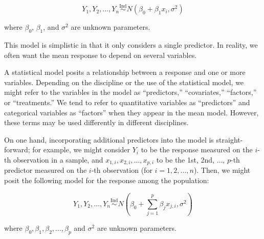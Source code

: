 \documentclass[
  letterpaper,
  DIV=11,
  numbers=noendperiod]{scrreprt}
\theoremstyle{definition}
\theoremstyle{plain}
\theoremstyle{definition}
\theoremstyle{remark}
\begin{document}
\[Y_1, Y_2, \dotsc, Y_n \stackrel{\text{Ind}}{\sim} N\left(\beta_0 + \beta_1 x_i, \sigma^2\right)\]

where \(\beta_0\), \(\beta_1\), and \(\sigma^2\) are unknown parameters.

This model is simplistic in that it only considers a single predictor.
In reality, we often want the mean response to depend on several
variables.

\begin{tcolorbox}[enhanced jigsaw, rightrule=.15mm, leftrule=.75mm, opacityback=0, coltitle=black, bottomrule=.15mm, opacitybacktitle=0.6, left=2mm, colframe=quarto-callout-note-color-frame, breakable, colback=white, arc=.35mm, toprule=.15mm, toptitle=1mm, bottomtitle=1mm, title=\textcolor{quarto-callout-note-color}{\faInfo}\hspace{0.5em}{Predictors vs.~Covariates}, titlerule=0mm, colbacktitle=quarto-callout-note-color!10!white]

A statistical model posits a relationship between a response and one or
more variables. Depending on the discipline or the use of the
statistical model, we might refer to the variables in the model as
``predictors,'' ``covariates,'' ``factors,'' or ``treatments.'' We tend
to refer to quantitative variables as ``predictors'' and categorical
variables as ``factors'' when they appear in the mean model. However,
these terms may be used differently in different disciplines.

\end{tcolorbox}

On one hand, incorporating additional predictors into the model is
straight-forward; for example, we might consider \(Y_i\) to be the
response measured on the \(i\)-th observation in a sample, and
\(x_{1,i}, x_{2, i}, \dotsc, x_{p,i}\) to be the 1st, 2nd, \(\dotsc\),
\(p\)-th predictor measured on the \(i\)-th observation (for
\(i = 1, 2, \dotsc, n\)). Then, we might posit the following model for
the response among the population:

\[Y_1, Y_2, \dotsc, Y_n \stackrel{\text{Ind}}{\sim} N\left(\beta_0 + \sum_{j=1}^{p} \beta_j x_{j,i}, \sigma^2\right)\]

where \(\beta_0, \beta_1, \beta_2, \dotsc, \beta_p\) and \(\sigma^2\)
are unknown parameters.
\end{document}
